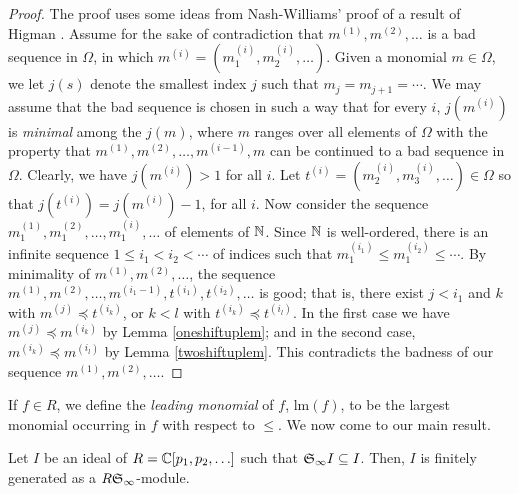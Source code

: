 \begin{proof}
The proof uses some ideas from Nash-Williams' proof \cite{NW} of a
result of Higman \cite{Higman}. Assume for the sake of
contradiction that $m^{(1)},m^{(2)},\dots$ is a bad sequence in
$\Omega$, in which $m^{(i)}=(m^{(i)}_1,m^{(i)}_2,\dots)$.  Given a
monomial $m \in \Omega$, we let $j(s)$ denote the smallest index
$j$ such that $m_{j}=m_{j+1}=\cdots$.  We may assume that the bad
sequence is chosen in such a way that for every $i$, $j(m^{(i)})$
is {\it minimal} among the $j(m)$, where $m$ ranges over all
elements of $\Omega$ with the property that
$m^{(1)},m^{(2)},\dots,m^{(i-1)},m$ can be continued to a bad
 sequence in $\Omega$.   Clearly, we have
$j(m^{(i)})>1$ for all $i$.  Let
$t^{(i)}=(m_2^{(i)},m_3^{(i)},\dots) \in \Omega$ so that
$j(t^{(i)})=j(m^{(i)})-1$, for all $i$.  Now consider the sequence
$m^{(1)}_1,m^{(2)}_1,\dots,m^{(i)}_1,\dots$ of elements of ${\mathbb N}$.
Since ${\mathbb N}$ is well-ordered, there is an infinite sequence $1\leq
i_1<i_2<\cdots$ of indices such that $m^{(i_1)}_1 \leq m^{(i_2)}_1
\leq \cdots$. By minimality of $m^{(1)},m^{(2)},\dots$, the
sequence
$m^{(1)},m^{(2)},\dots,m^{(i_1-1)},t^{(i_1)},t^{(i_2)},\dots$ is
good; that is, there exist $j < i_1$ and $k$ with $m^{(j)} \preceq
t^{(i_k)}$, or $k<l$ with $t^{(i_k)} \preceq t^{(i_l)}$. In the
first case we have $m^{(j)}\preceq m^{(i_k)}$ by Lemma
\ref{oneshiftuplem}; and in the second case, $m^{(i_k)}\preceq
m^{(i_l)}$ by Lemma \ref{twoshiftuplem}. This contradicts the
badness of our sequence $m^{(1)},m^{(2)},\dots$.
\end{proof}

If $f \in R$, we define the \textit{leading monomial} of $f$,
lm$(f)$, to be the largest monomial occurring in $f$ with respect
to $\leq$. We now come to our main result.

\begin{theorem}\label{onevarfinitegenthm}
Let $I$ be an ideal of $R = {\mathbb C}[p_1,p_2,\ldots]$ such that ${\frak
S}_{\infty}I \subseteq I$.  Then, $I$ is finitely generated as a
$R {\frak S}_{\infty}$-module.
\end{theorem}


